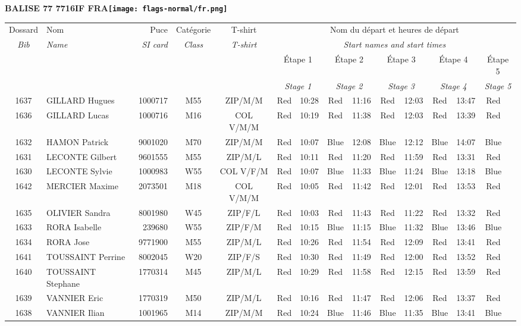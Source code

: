 \documentclass{report}
\begin{document}
\newpage
  \Huge \centering \bfseries BALISE 77 7716IF FRA\normalfont \footnotesize \sffamily \hfill \texttt{[image: flags-normal/fr.png]} \newline 
  \begin{longtable}{|c|l|r|c|c|*{5}{cc|}}
    Dossard & Nom  & Puce    & Catégorie & T-shirt & \multicolumn{10}{c|}{Nom du départ et heures de départ} \\
    \itshape Bib     & \itshape Name & \itshape SI card & \itshape Class  & \itshape  T-shirt  & \multicolumn{10}{c|}{\itshape Start names and start times} \\
    \hline
    & & & & & \multicolumn{2}{c|}{Étape 1} & \multicolumn{2}{c|}{Étape 2} & \multicolumn{2}{c|}{Étape 3} & \multicolumn{2}{c|}{Étape 4} & \multicolumn{2}{c|}{Étape 5} \\
    & & & & & \multicolumn{2}{c|}{\itshape Stage 1} & \multicolumn{2}{c|}{\itshape Stage 2} & \multicolumn{2}{c|}{\itshape Stage 3} & \multicolumn{2}{c|}{\itshape Stage 4} & \multicolumn{2}{c|}{\itshape Stage 5} \\
    \hline
    1637 & GILLARD Hugues & 1000717 & M55 & ZIP/M/M & Red & 10:28 & Red & 11:16 & Red & 12:03 & Red & 13:47 & Red &  \\
    1636 & GILLARD Lucas & 1000716 & M16 & COL V/M/M & Red & 10:19 & Red & 11:38 & Red & 12:03 & Red & 13:39 & Red &  \\
    1632 & HAMON Patrick & 9001020 & M70 & ZIP/M/M & Red & 10:07 & Blue & 12:08 & Blue & 12:12 & Blue & 14:07 & Blue &  \\
    1631 & LECONTE Gilbert & 9601555 & M55 & ZIP/M/L & Red & 10:11 & Red & 11:20 & Red & 11:59 & Red & 13:31 & Red &  \\
    1630 & LECONTE Sylvie & 1000983 & W55 & COL V/F/M & Red & 10:07 & Blue & 11:33 & Blue & 11:24 & Blue & 13:18 & Blue &  \\
    1642 & MERCIER Maxime & 2073501 & M18 & COL V/M/M & Red & 10:05 & Red & 11:42 & Red & 12:01 & Red & 13:53 & Red &  \\
    1635 & OLIVIER Sandra & 8001980 & W45 & ZIP/F/L & Red & 10:03 & Red & 11:43 & Red & 11:22 & Red & 13:32 & Red &  \\
    1633 & RORA Isabelle & 239680 & W55 & ZIP/F/M & Red & 10:15 & Blue & 11:15 & Blue & 11:32 & Blue & 13:46 & Blue &  \\
    1634 & RORA Jose & 9771900 & M55 & ZIP/M/L & Red & 10:26 & Red & 11:54 & Red & 12:09 & Red & 13:41 & Red &  \\
    1641 & TOUSSAINT Perrine & 8002045 & W20 & ZIP/F/S & Red & 10:30 & Red & 11:49 & Red & 12:00 & Red & 13:52 & Red &  \\
    1640 & TOUSSAINT Stephane & 1770314 & M45 & ZIP/M/L & Red & 10:29 & Red & 11:58 & Red & 12:15 & Red & 13:59 & Red &  \\
    1639 & VANNIER Eric & 1770319 & M50 & ZIP/M/L & Red & 10:16 & Red & 11:47 & Red & 12:06 & Red & 13:37 & Red &  \\
    1638 & VANNIER Ilian & 1001965 & M14 & ZIP/M/M & Red & 10:24 & Blue & 11:46 & Blue & 11:35 & Blue & 13:41 & Blue &  \\
  \end{longtable}
\end{document}
